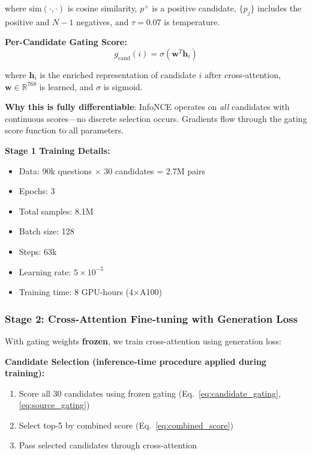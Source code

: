 \documentclass[10pt,twocolumn]{article}
\begin{document}
where $\text{sim}(\cdot, \cdot)$ is cosine similarity, $p^+$ is a positive candidate, $\{p_j\}$ includes the positive and $N-1$ negatives, and $\tau=0.07$ is temperature.

\textbf{Per-Candidate Gating Score:}
\begin{equation}
g_{\text{cand}}(i) = \sigma(\mathbf{w}^T \mathbf{h}_i)
\label{eq:candidate_gating}
\end{equation}

where $\mathbf{h}_i$ is the enriched representation of candidate $i$ after cross-attention, $\mathbf{w} \in \mathbb{R}^{768}$ is learned, and $\sigma$ is sigmoid.

\textbf{Why this is fully differentiable}: InfoNCE operates on \textit{all} candidates with continuous scores—no discrete selection occurs. Gradients flow through the gating score function to all parameters.

\textbf{Stage 1 Training Details:}
\begin{itemize}
    \item Data: 90k questions $\times$ 30 candidates = 2.7M pairs
    \item Epochs: 3
    \item Total samples: 8.1M
    \item Batch size: 128
    \item Steps: 63k
    \item Learning rate: $5 \times 10^{-5}$
    \item Training time: 8 GPU-hours (4$\times$A100)
\end{itemize}

\subsubsection{Stage 2: Cross-Attention Fine-tuning with Generation Loss}
\label{sec:stage2}

With gating weights \textbf{frozen}, we train cross-attention using generation loss:

\textbf{Candidate Selection (inference-time procedure applied during training):}
\begin{enumerate}
    \item Score all 30 candidates using frozen gating (Eq.~\ref{eq:candidate_gating}, \ref{eq:source_gating})
    \item Select top-5 by combined score (Eq.~\ref{eq:combined_score})
    \item Pass selected candidates through cross-attention
\end{enumerate}
\end{document}

